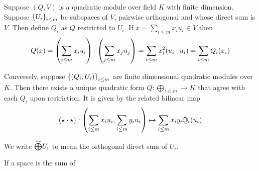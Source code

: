 \begin{dfn}
    Suppose $(Q,V)$ is a quadratic module over field $K$
    with finite dimension.
    Suppose $\left\{U_i\right\}_{i \le m}$ be subspaces of $V$,
    pairwise orthogonal and whose direct sum is $V$.
    Then define $Q_i$ as $Q$ restricted to $U_i$.
    If $x = \sum_{i\le m} x_i u_i \in V$ then 
    \[Q(x) = \left(\sum_{i\le m} x_i u_i\right) 
    \cdot \left(\sum_{j\le m} x_j u_j\right) = 
    \sum_{i\le m} x_i^2 (u_i \cdot u_i)
    = \sum_{i\le m} Q_i(x_i)\]

    Conversely, 
    suppose $\left\{(Q_i, U_i)\right\}_{i \le m}$ are finite dimensional 
    quadratic modules over $K$. 
    Then there exists a unique quadratic form 
    $Q : \bigoplus_{i \le m} \to K$ 
    that agree with each $Q_i$ upon restriction.
    It is given by the related bilinear map 
    \[(\star\cdot\star) : 
    \left(\sum_{i\le m} x_i u_i,\sum_{i\le m} y_i u_i\right)
    \mapsto \sum_{i\le m} x_i y_i \mathbb{Q}_i(u_i)\]

    We write $\widehat{\bigoplus} U_i$ to mean the orthogonal direct sum of $U_i$.
\end{dfn}

\begin{dfn}
    If a space is the sum of 
\end{dfn}

